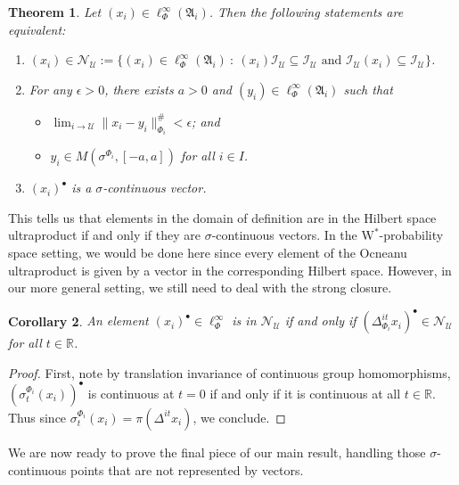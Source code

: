 \documentclass[12pt]{amsart}
\newtheorem{thm}{Theorem}[section]
\newtheorem{cor}[thm]{Corollary}
\theoremstyle{definition}
\def\cal{\mathcal}
\newcommand{\wstar}{$\mathrm{W}^*$}
\newcommand\cU{{\cal U}}
\def \bbR{\mathbb{R}}
\begin{document}
\begin{thm}\label{ultracontinuous1}
    Let $(x_i) \in \ell_{\Phi}^\infty(\mathfrak{A}_i)$.  Then the following statements are equivalent:
    \begin{enumerate}
        \item $(x_i) \in \cal N_{\cU} := \{(x_i) \in \ell_{\Phi}^\infty(\mathfrak{A}_i) \ : \ (x_i) \cal I_{\cU} \subseteq \cal I_{\cU} \text{ and } \cal I_{\cU} (x_i)  \subseteq \cal I_{\cU}\}$.
        \item For any $\epsilon > 0$, there exists $a > 0$ and $(y_i) \in \ell_{\Phi}^\infty(\mathfrak{A}_i)$ such that
        \begin{itemize}
            \item $\lim_{i \to \cU} \|x_i - y_i\|^\#_{\Phi_i} < \epsilon$; and
            \item $y_i \in M(\sigma^{\Phi_i}, [-a, a])$ for all $i \in I$.
        \end{itemize}
        \item $(x_i)^\bullet$ is a $\sigma$-continuous vector.
    \end{enumerate}
\end{thm}

This tells us that elements in the domain of definition are in the Hilbert space ultraproduct if and only if they are $\sigma$-continuous vectors.  In the \wstar-probability space setting, we would be done here since every element of the Ocneanu ultraproduct is given by a vector in the corresponding Hilbert space.  However, in our more general setting, we still need to deal with the strong closure.

\begin{cor}
    An element $(x_i)^\bullet \in \ell^{\infty}_{\Phi}$ is in $\cal N_{\cU}$ if and only if $(\Delta_{\Phi_i}^{it}x_i)^\bullet \in \cal N_{\cU}$ for all $t \in \bbR$.
\end{cor}

\begin{proof}
    First, note by translation invariance of continuous group homomorphisms, $(\sigma_t^{\Phi_i}(x_i))^\bullet$ is continuous at $t = 0$ if and only if it is continuous at all $t \in \bbR$.  Thus since $\sigma_t^{\Phi_i}(x_i) = \pi(\Delta^{it}x_i)$, we conclude.
\end{proof}

We are now ready to prove the final piece of our main result, handling those $\sigma$-continuous points that are not represented by vectors.
\end{document}
